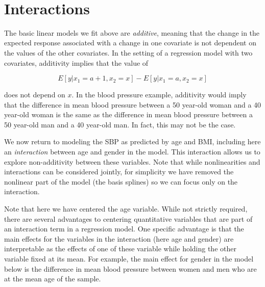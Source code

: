 \documentclass[11pt]{article}
\begin{document}
    \begin{center}
    \end{center}
    { \hspace*{\fill} \\}
    
    \hypertarget{interactions}{%
\section{Interactions}\label{interactions}}

    The basic linear models we fit above are \emph{additive}, meaning that
the change in the expected response associated with a change in one
covariate is not dependent on the values of the other covariates. In the
setting of a regression model with two covariates, additivity implies
that the value of

\[
E[y | x_1=a+1, x_2=x] - E[y | x_1=a, x_2=x]
\]

does not depend on \(x\). In the blood pressure example, additivity
would imply that the difference in mean blood pressure between a 50
year-old woman and a 40 year-old woman is the same as the difference in
mean blood pressure between a 50 year-old man and a 40 year-old man. In
fact, this may not be the case.

    We now return to modeling the SBP as predicted by age and BMI, including
here an \emph{interaction} between age and gender in the model. This
interaction allows us to explore non-additivity between these variables.
Note that while nonlinearities and interactions can be considered
jointly, for simplicity we have removed the nonlinear part of the model
(the basis splines) so we can focus only on the interaction.

    Note that here we have centered the age variable. While not strictly
required, there are several advantages to centering quantitative
variables that are part of an interaction term in a regression model.
One specific advantage is that the main effects for the variables in the
interaction (here age and gender) are interpretable as the effects of
one of these variable while holding the other variable fixed at its
mean. For example, the main effect for gender in the model below is the
difference in mean blood pressure between women and men who are at the
mean age of the sample.
\end{document}
